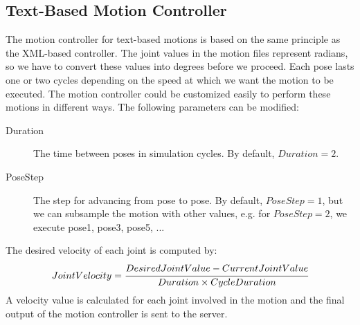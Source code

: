 \subsection{Text-Based Motion Controller}
The motion controller for text-based motions is based on the same principle as the XML-based controller. The joint values in the motion files represent radians, so we have to convert these values into degrees before we proceed. Each pose lasts one or two cycles depending on the speed at which we want the motion to be executed. The motion controller could be customized easily to perform these motions in different ways. The following parameters can be modified:
\begin{description}
	\item[Duration] The time between poses in simulation cycles. By default, $Duration=2$.
	\item[PoseStep] The step for advancing from pose to pose. By default, $PoseStep=1$, but we can subsample the motion with other values, e.g. for $PoseStep=2$, we execute pose1, pose3, pose5, ...
\end{description}
The desired velocity of each joint is computed by:
\[
JointVelocity = \cfrac {Desired Joint Value - Current Joint Value} {Duration \times CycleDuration}
\]
A velocity value is calculated for each joint involved in the motion and the final output of the motion controller is sent to the server. 

